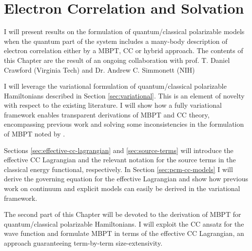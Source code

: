 \chapter{Electron Correlation and Solvation}\label{ch:solvation-correlation}

\begin{epigraphs}
\end{epigraphs}

I will present results on the formulation of quantum/classical
polarizable models when the quantum part of the system includes a
many-body description of electron correlation either by a \gls{MBPT},
\gls{CC} or hybrid approach.
The contents of this Chapter are the result of an ongoing collaboration
with prof. T. Daniel Crawford (Virginia Tech) and Dr. Andrew
C. Simmonett (NIH)

I will leverage the variational formulation of quantum/classical
polarizable Hamiltonians described in Section \ref{sec:variational}.
This is an element of novelty with respect to the existing literature.
I will show how a fully variational framework enables transparent
derivations of \acrshort{MBPT} and \acrshort{CC} theory, encompassing
previous work\autocite{Christiansen1999-tj, Cammi2009-gu,
Caricato2010-hx, Caricato2011-tx, Olivares_del_Valle1991-of,
Aguilar1991-vq, Olivares_del_Valle1991-tq, Olivares_del_Valle1993-xq,
Olivares_del_Valle1993-ra, Surjan1983-oc, Angyan1991-mr, Angyan1993-ay,
Angyan2008-nj, Nielsen2001-yl, Kongsted2003-py, Sneskov2010-dz,
Sneskov2011-jm, Schwabe2012-cf}
and solving some inconsistencies in the formulation of \acrshort{MBPT}
noted by \citeauthor{Angyan1995-co}.\autocite{Angyan1995-co,
Lipparini2009-io}

Sections \ref{sec:effective-cc-lagrangian} and \ref{sec:source-terms}
will introduce the effective \acrshort{CC} Lagrangian and the relevant
notation for the source terms in the classical energy functional,
respectively.
In Section \ref{sec:pcm-cc-models} I will derive the governing equation
for the effective Lagrangian and show how previous work on
continuum\autocite{Christiansen1999-tj, Cammi2009-gu, Caricato2011-tx}
and explicit models\autocite{Kongsted2003-py, Sneskov2011-jm} can easily
be derived in the variational framework.

The second part of this Chapter will be devoted to the derivation of
\acrshort{MBPT} for quantum/classical polarizable Hamiltonians.
I will exploit the \acrshort{CC} ansatz for the wave function and formulate
\acrshort{MBPT} in terms of the effective \acrshort{CC} Lagrangian, an approach
guaranteeing term-by-term size-extensivity.


